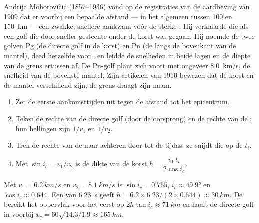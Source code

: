 \begin{history}
Andrija Mohorovičić (1857--1936) vond op de registraties van de aardbeving van
1909 dat er voorbij een bepaalde afstand --- in het algemeen tussen 100 en
\qty{150}{km} --- een zwakke, snellere  aankwam vóór de sterke .
Hij verklaarde die als een golf die door sneller gesteente onder de korst was
gegaan. Hij noemde de twee golven Pg (de directe golf in de korst) en Pn (de
 langs de bovenkant van de mantel), deed hetzelfde voor , en leidde
de snelheden in beide lagen en de diepte van de grens ertussen af. De Pn-golf
plant zich voort met ongeveer \qty{8.0}{km/s}, de snelheid van de bovenste mantel.
Zijn artikelen van 1910 bewezen dat de korst en de mantel verschillend zijn; de
grens draagt zijn naam.
\end{history}

\begin{method}\label{met:g11:seismic-structure:moho}
\begin{enumerate}
  \item Zet de eerste aankomsttijden uit tegen de afstand tot het
        epicentrum.
  \item Teken de rechte van de directe golf (door de oorsprong) en de rechte
        van de ; hun hellingen zijn $1/v_1$ en $1/v_2$.
  \item Trek de rechte van de  naar achteren door tot de tijdas: ze snijdt
        die op de  $t_i$.
  \item Met $\sin i_c = v_1/v_2$ is de dikte van de korst
        $h = \dfrac{v_1\,t_i}{2\cos i_c}$.
\end{enumerate}
\end{method}

\begin{example}\label{ex:g11:seismic-structure:moho}
Met $v_1 = \qty{6.2}{km/s}$ en $v_2 = \qty{8.1}{km/s}$ is $\sin i_c = 0.765$,
$i_c \approx \ang{49.9}$ en $\cos i_c \approx 0.644$. Een  van
\qty{6.23}{s} geeft $h = 6.2 \times 6.23/(2 \times 0.644) \approx
\qty{30}{km}$. De  bereikt het oppervlak voor het eerst op
$2h\tan i_c \approx \qty{71}{km}$ en haalt de directe golf in voorbij
$x_c = 60\sqrt{14.3/1.9} \approx \qty{165}{km}$.
\end{example}

